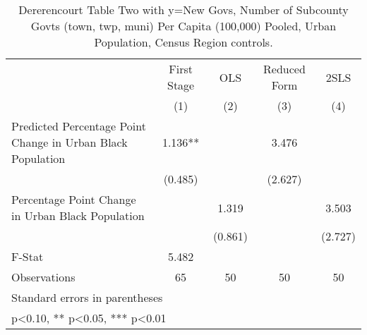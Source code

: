\begin{table}[htbp]\centering
\def\sym#1{\ifmmode^{#1}\else\(^{#1}\)\fi}
\caption{Dererencourt Table Two with y=New Govs, Number of Subcounty Govts (town, twp, muni) Per Capita (100,000) Pooled, Urban Population, Census Region controls.}
\begin{tabular}{l*{4}{c}}
\toprule
                    & First Stage   &         OLS   &Reduced Form   &        2SLS   \\
                    &\multicolumn{1}{c}{(1)}   &\multicolumn{1}{c}{(2)}   &\multicolumn{1}{c}{(3)}   &\multicolumn{1}{c}{(4)}   \\
\midrule
Predicted Percentage Point Change in Urban Black Population&       1.136** &               &       3.476   &               \\
                    &     (0.485)   &               &     (2.627)   &               \\
\addlinespace
Percentage Point Change in Urban Black Population&               &       1.319   &               &       3.503   \\
                    &               &     (0.861)   &               &     (2.727)   \\
\midrule
F-Stat              &       5.482   &               &               &               \\
Observations        &          65   &          50   &          50   &          50   \\
\bottomrule
\multicolumn{5}{l}{\footnotesize Standard errors in parentheses}\\
\multicolumn{5}{l}{\footnotesize * p<0.10, ** p<0.05, *** p<0.01}\\
\end{tabular}
\end{table}
